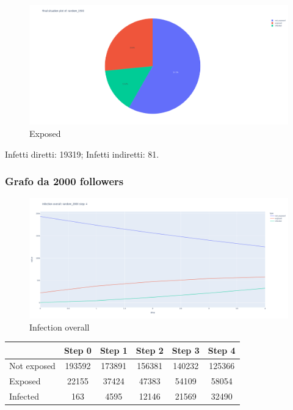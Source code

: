         \begin{figure}[H]
            \includegraphics[width=16cm]{resources/charts/random_1500_pie.png}
            \caption{Exposed}
            \label{fig:random_1500_pie}
        \end{figure}
        Infetti diretti: 19319; \newline
        Infetti indiretti: 81.
        
    
    \subsubsection{Grafo da 2000 followers}
        \begin{figure}[H]
            \includegraphics[width=16cm]{resources/charts/random_2000_line.png}
            \caption{Infection overall}
            \label{fig:random_2000_line}
        \end{figure}
        
        \begin{table}[H]
            \centering
            \begin{tabular}{|l|c|c|c|c|c|}
            \hline
                        & Step 0 & Step 1 & Step 2 & Step 3 & Step 4 \\ \hline
            Not exposed & 193592 & 173891 & 156381 & 140232 & 125366 \\ \hline
            Exposed     & 22155  & 37424  & 47383  & 54109  & 58054  \\ \hline
            Infected    & 163    & 4595   & 12146  & 21569  & 32490  \\ \hline
            \end{tabular}
        \end{table}
        
